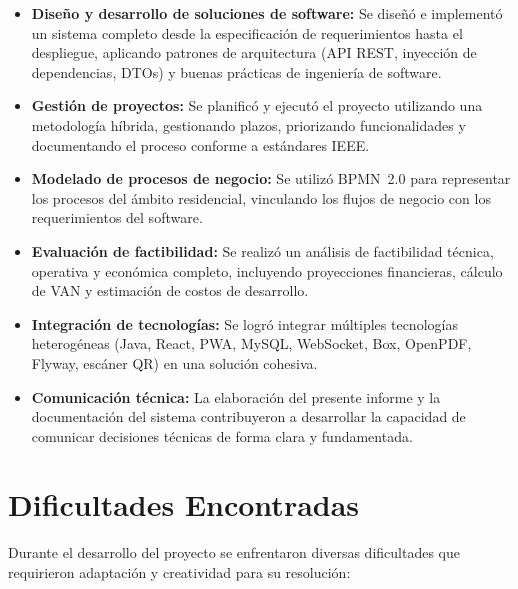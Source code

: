 \begin{itemize}
    \item \textbf{Diseño y desarrollo de soluciones de software:} Se diseñó e implementó un sistema completo desde la especificación de requerimientos hasta el despliegue, aplicando patrones de arquitectura (API REST, inyección de dependencias, DTOs) y buenas prácticas de ingeniería de software.

    \item \textbf{Gestión de proyectos:} Se planificó y ejecutó el proyecto utilizando una metodología híbrida, gestionando plazos, priorizando funcionalidades y documentando el proceso conforme a estándares IEEE.

    \item \textbf{Modelado de procesos de negocio:} Se utilizó BPMN~2.0 para representar los procesos del ámbito residencial, vinculando los flujos de negocio con los requerimientos del software.

    \item \textbf{Evaluación de factibilidad:} Se realizó un análisis de factibilidad técnica, operativa y económica completo, incluyendo proyecciones financieras, cálculo de VAN y estimación de costos de desarrollo.

    \item \textbf{Integración de tecnologías:} Se logró integrar múltiples tecnologías heterogéneas (Java, React, PWA, MySQL, WebSocket, Box, OpenPDF, Flyway, escáner QR) en una solución cohesiva.

    \item \textbf{Comunicación técnica:} La elaboración del presente informe y la documentación del sistema contribuyeron a desarrollar la capacidad de comunicar decisiones técnicas de forma clara y fundamentada.
\end{itemize}

\section{Dificultades Encontradas}

Durante el desarrollo del proyecto se enfrentaron diversas dificultades que requirieron adaptación y creatividad para su resolución:

